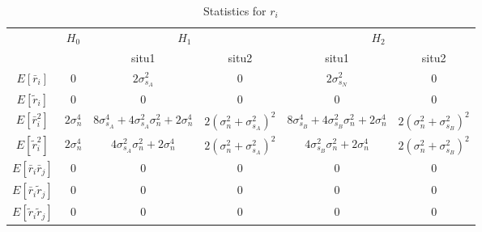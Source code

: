\begin{table}[h]
  \begin{tabular}{|c|c|c|c|c|c|}
	\hline
	\multirow{2}{*}{}           & \multirow{2}{*}{$H_0$} & \multicolumn{2}{c|}{$H_1$}                                                               & \multicolumn{2}{c|}{$H_2$}                                                               \\ \cline{3-6} 
	&                        & situ1                                                   & situ2                          & situ1                                                   & situ2                          \\ \hline
	$E[\bar{r}_i]$              & $0$                    & $2\sigma_{s_A}^2$                                       & $0$                            & $2\sigma_{s_N}^2$                                                         & $0$                            \\ \hline
	$E[\tilde{r}_i]$            & $0$                    & $0$                                                     & $0$                            & $0$                                                     & $0$                            \\ \hline
	$E[\bar{r}_i^2]$            & $2\sigma_n^4$          & $8\sigma_{s_A}^4+4\sigma_{s_A}^2\sigma_n^2+2\sigma_n^4$ & $2(\sigma_n^2+\sigma_{s_A}^2)^2$ & $8\sigma_{s_B}^4+4\sigma_{s_B}^2\sigma_n^2+2\sigma_n^4$ & $2(\sigma_n^2+\sigma_{s_B}^2)^2$ \\ \hline
	$E[\tilde{r}_i^2]$          & $2\sigma_n^4$          & $4\sigma_{s_A}^2\sigma_n^2+2\sigma_n^4$                 & $2(\sigma_n^2+\sigma_{s_A}^2)^2$ & $4\sigma_{s_B}^2\sigma_n^2+2\sigma_n^4$                 & $2(\sigma_n^2+\sigma_{s_B}^2)^2$ \\ \hline
	$E[\bar{r}_i\bar{r}_j]$     & $0$                    & $0$                                                     & $0$                            & $0$                                                     & $0$                            \\ \hline
	$E[\bar{r}_i\tilde{r}_j]$   & $0$                    & $0$                                                     & $0$                            & $0$                                                     & $0$                            \\ \hline
	$E[\tilde{r}_i\tilde{r}_j]$ & $0$                    & $0$                                                     & $0$                            & $0$                                                     & $0$                            \\ \hline
  \end{tabular}
  \caption{Statistics for $r_i$}
  \label{table1}
\end{table}


